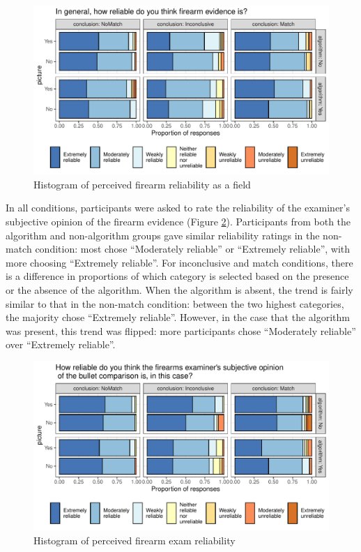 \documentclass[print]{nuthesis}
\begin{document}
\begin{figure}

{\centering \includegraphics[width=\linewidth]{thesis_files/figure-latex/genrel-1} 

}

\caption{Histogram of perceived firearm reliability as a field}\label{fig:genrel}
\end{figure}

In all conditions, participants were asked to rate the reliability of the examiner's subjective opinion of the firearm evidence (Figure \ref{fig:examrel}).
Participants from both the algorithm and non-algorithm groups gave similar reliability ratings in the non-match condition: most chose ``Moderately reliable'' or ``Extremely reliable'', with more choosing ``Extremely reliable''.
For inconclusive and match conditions, there is a difference in proportions of which category is selected based on the presence or the absence of the algorithm.
When the algorithm is absent, the trend is fairly similar to that in the non-match condition: between the two highest categories, the majority chose ``Extremely reliable''.
However, in the case that the algorithm was present, this trend was flipped: more participants chose ``Moderately reliable'' over ``Extremely reliable''.

\begin{figure}

{\centering \includegraphics[width=\linewidth]{thesis_files/figure-latex/examrel-1} 

}

\caption{Histogram of perceived firearm exam reliability}\label{fig:examrel}
\end{figure}
\end{document}
